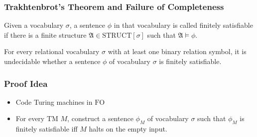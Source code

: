 \documentclass{beamer}
\newcommand{\FO}{\ensuremath{\mathrm{FO}}}
\newcommand{\structa}{\ensuremath{\mathfrak{A}}}
\begin{document}
\begin{frame}
  \frametitle{Trakhtenbrot's Theorem and Failure of Completeness}

  \begin{definition}
    Given a vocabulary $\sigma$, a sentence $\phi$ in that vocabulary is called
    finitely satisfiable if there is a finite structure $\structa \in
    \mathrm{STRUCT}[\sigma]$ such that $\structa \models \phi$.
  \end{definition}
  
  \pause

  \begin{theorem}[Trakhtenbrot]
    For every relational vocabulary $\sigma$ with at least one binary relation
    symbol, it is undecidable whether a sentence $\phi$ of vocabulary
    $\sigma$ is finitely satisfiable.
  \end{theorem}

\end{frame}

\begin{frame}
  \frametitle{Proof Idea}

  \begin{itemize}
    \item Code Turing machines in $\FO$
    \item For every TM $M$, construct a sentence $\phi_M$ of vocabulary $\sigma$
    such that $\phi_M$ is finitely satisfiable iff $M$ halts on the empty input.
  \end{itemize}

\end{frame}
\end{document}
